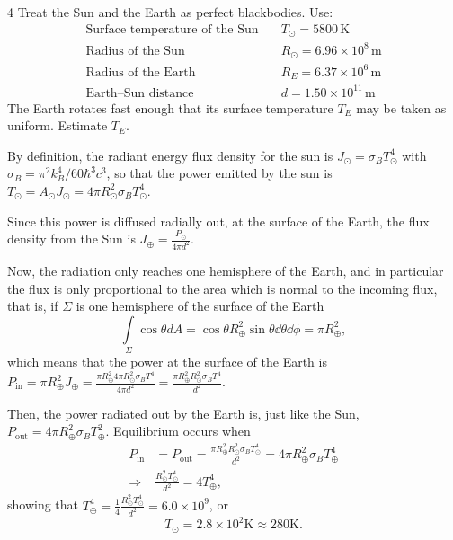 \documentclass[11pt]{article}
\begin{document}
\begin{problem}{4}
Treat the Sun and the Earth as perfect blackbodies.
Use:
\begin{equation}
  \label{eq:p4-sun-earth-data}
  \begin{aligned}
    \text{Surface temperature of the Sun} \quad & T_{\odot} = 5800\,\mathrm{K} \\
    \text{Radius of the Sun} \quad & R_{\odot} = 6.96\times 10^8\,\mathrm{m} \\
    \text{Radius of the Earth} \quad & R_E = 6.37\times 10^6\,\mathrm{m} \\
    \text{Earth--Sun distance} \quad & d = 1.50\times 10^{11}\,\mathrm{m}
  \end{aligned}
\end{equation}
The Earth rotates fast enough that its surface temperature \( T_E \) may be taken as uniform.
Estimate \( T_E \).
\end{problem}
\begin{answer}
  By definition, the radiant energy flux density for the sun is \( J_{\odot} = \sigma_B T_{\odot}^4 \) with \(\sigma_B = \pi^2 k_B^4 / 60 \hbar^3 c^3 \), so that the power emitted by the sun is \( T_{\odot} = A_{\odot}J_{\odot} = 4\pi R_{\odot}^2\sigma_BT_{\odot}^4\).

  Since this power is diffused radially out, at the surface of the Earth, the flux density from the Sun is \( J_{\oplus} = \frac{P_{\odot}}{4\pi d^2} \).

  Now, the radiation only reaches one hemisphere of the Earth, and in particular the flux is only proportional to the area which is normal to the incoming flux, that is, if \(\Sigma\) is one hemisphere of the surface of the Earth
  \begin{equation}
  \label{eq:6}
  \int\limits_{\Sigma} \cos\theta dA = \cos\theta R^2_{\oplus} \sin\theta \dd \theta \dd \phi = \pi R_{\oplus}^2,
\end{equation}
which means that the power at the surface of the Earth is \( P_{\text{in}} = \pi R_{\oplus}^2 J_{\oplus} = \frac{\pi R_{\oplus}^2 4\pi R_{\odot}^2\sigma_BT^4}{4\pi d^2} = \frac{\pi R_{\oplus}^2 R_{\odot}^2 \sigma_{B} T^{4}}{d^2} \).

Then, the power radiated out by the Earth is, just like the Sun, \( P_{\text{out}} = 4\pi R_{\oplus}^2\sigma_BT_{\oplus}^2 \).
Equilibrium occurs when
\begin{equation}
  \begin{aligned}
    P_{\text{in}} &= P_{\text{out}} = \frac{\pi R_{\oplus}^2 R_{\odot}^2 \sigma_B T_{\odot}^4}{d^2} = 4\pi R_{\oplus}^2 \sigma_{B} T_{\oplus}^{4} \\
    \Rightarrow &\frac{R_{\odot}^2 T_{\odot}^4}{d^2} = 4T_{\oplus}^{4},
  \end{aligned}
\label{eq:7}
\end{equation}
showing that \( T_{\oplus}^{4} = \frac{1}{4} \frac{R_{\odot}^2 T _{\odot}^4}{d^2} = 6.0 \times 10^{9} \), or
\begin{equation}
\label{eq:8}
T_{\odot} = 2.8 \times 10^2 \text{K} \approx 280 \text{K}.
\end{equation}
\end{answer}
\end{document}
